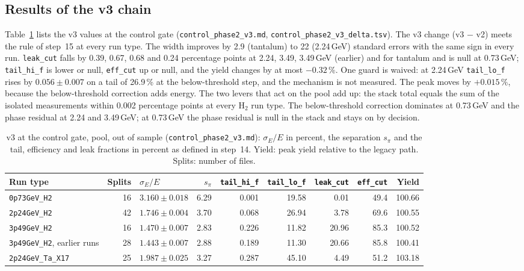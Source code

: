 \documentclass[11pt]{article}
\newcommand{\code}[1]{\texttt{#1}}
\begin{document}
\subsection{Results of the v3 chain}\label{sec:calibres}

Table~\ref{tab:calibres} lists the v3 values at the control gate (\code{control\_phase2\_v3.md}, \code{control\_phase2\_v3\_delta.tsv}). The v3 change (v3 $-$ v2) meets the rule of step~15 at every run type. The width improves by 2.9 (tantalum) to 22 (2.24\,GeV) standard errors with the same sign in every run. \code{leak\_cut} falls by 0.39, 0.67, 0.68 and 0.24 percentage points at 2.24, 3.49, 3.49\,GeV (earlier) and for tantalum and is null at 0.73\,GeV; \code{tail\_hi\_f} is lower or null, \code{eff\_cut} up or null, and the yield changes by at most $-0.32\,\%$. One guard is waived: at 2.24\,GeV \code{tail\_lo\_f} rises by $0.056 \pm 0.007$ on a tail of 26.9\,\% at the below-threshold step, and the mechanism is not measured. The peak moves by $+0.015\,\%$, because the below-threshold correction adds energy. The two levers that act on the pool add up: the stack total equals the sum of the isolated measurements within 0.002 percentage points at every H$_2$ run type. The below-threshold correction dominates at 0.73\,GeV and the phase residual at 2.24 and 3.49\,GeV; at 0.73\,GeV the phase residual is null in the stack and stays on by decision.

\begin{table}[htbp]
\centering
\caption{v3 at the control gate, pool, out of sample (\code{control\_phase2\_v3.md}): $\sigma_E/E$ in percent, the separation $s_\pi$ and the tail, efficiency and leak fractions in percent as defined in step~14. Yield: peak yield relative to the legacy path. Splits: number of files.}
\label{tab:calibres}
\small
\begin{tabular}{lrlrrrrrr}
\toprule
Run type & Splits & $\sigma_E/E$ & $s_\pi$ & \code{tail\_hi\_f} & \code{tail\_lo\_f} & \code{leak\_cut} & \code{eff\_cut} & Yield \\
\midrule
\code{0p73GeV\_H2} & 16 & $3.160 \pm 0.018$ & 6.29 & 0.001 & 19.58 & 0.01 & 49.4 & 100.66 \\
\code{2p24GeV\_H2} & 42 & $1.746 \pm 0.004$ & 3.70 & 0.068 & 26.94 & 3.78 & 69.6 & 100.55 \\
\code{3p49GeV\_H2} & 16 & $1.470 \pm 0.007$ & 2.83 & 0.226 & 11.82 & 20.96 & 85.3 & 100.52 \\
\code{3p49GeV\_H2}, earlier runs & 28 & $1.443 \pm 0.007$ & 2.88 & 0.189 & 11.30 & 20.66 & 85.8 & 100.41 \\
\code{2p24GeV\_Ta\_X17} & 25 & $1.987 \pm 0.025$ & 3.27 & 0.287 & 45.10 & 4.49 & 51.2 & 103.18 \\
\bottomrule
\end{tabular}
\end{table}
\end{document}
